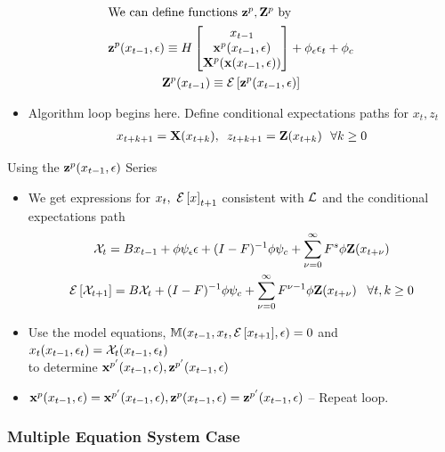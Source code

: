 \documentclass[12pt]{article}
\begin{document}
\begin{gather*}
 \intertext{We can define functions $\mathbf{z}^p,\mathbf{Z}^p$ by}
\mathbf{z}^p(x_{t-1},\epsilon)\equiv H
\begin{bmatrix}
x_{t-1}\\ \mathbf{x}^p(x_{t-1},\epsilon)\\ \mathbf{X}^p(\mathbf{x}(x_{t-1},\epsilon))
\end{bmatrix}+\phi_\epsilon \epsilon_t+\phi_c\\
\mathbf{Z}^p(x_{t-1})\equiv {\mathcal{E}\left [  \mathbf{z}^p(x_{t-1},\epsilon)\right ]}
\end{gather*}
 \begin{itemize}
\item  {\color{blue}Algorithm loop begins here.} Define conditional expectations paths for $x_t, z_t$ 
 \begin{gather*}
 x_{t+k+1}=\mathbf{X}(x_{t+k}),\,\,\,z_{t+k+1}=\mathbf{Z}(x_{t+k})\,\,\,\,  \forall k\ge 0      \end{gather*}
   \end{itemize}

{Using the $\mathbf{z}^p(x_{t-1},\epsilon)$ Series}
{\small
  \begin{itemize}
  \item We get expressions for $x_t,\,\, {\mathcal{E}\left [ x \right ]}_{t+1}$ consistent with ${\mathcal{L}}$ and the conditional expectations path
   \begin{gather*}
     \mathcal{X}_{t} =B x_{t-1}+ \phi \psi_\epsilon\epsilon + (I - F)^{-1} \phi \psi_c + \sum_{{\nu}=0}^\infty F^s \phi \mathbf{Z}(x_{t+\nu})\\
	{\mathcal{E}\left [  \mathcal{X}_{t+1} \right ]} =B \mathcal{X}_{t}  + (I - F)^{-1} \phi \psi_c+ \sum_{{\nu} =0}^\infty F^{{\nu}-1} \phi \mathbf{Z}(x_{t+\nu}) \,\,\,\,\,\forall t,k \ge  0
\end{gather*}
\item Use the model equations, $\mathbb{M}(x_{t-1},x_t,{\mathcal{E}\left [ x_{t+1} \right ]},\epsilon)=0$ and $x_t(x_{t-1},\epsilon_t)=\mathcal{X}_t(x_{t-1},\epsilon_t)$\\ to determine $\mathbf{x}^{p'}(x_{t-1},\epsilon), \mathbf{z}^{p'}(x_{t-1},\epsilon)$
\item $\mathbf{x}^p(x_{t-1},\epsilon)=\mathbf{x}^{p'}(x_{t-1},\epsilon), \mathbf{z}^p(x_{t-1},\epsilon)=\mathbf{z}^{p'}(x_{t-1},\epsilon)$ -- {\color{blue}Repeat loop.}
  \end{itemize}
}

\subsubsection{Multiple Equation System Case}
\end{document}
